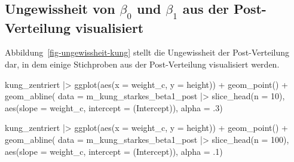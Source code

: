 \documentclass[
  ngerman,
  letterpaper,
  twoside,
  open=any]{scrbook}
\newenvironment{Shaded}{\begin{snugshade}}{\end{snugshade}}
\newcommand{\AttributeTok}[1]{\textcolor[rgb]{0.40,0.45,0.13}{#1}}
\newcommand{\DecValTok}[1]{\textcolor[rgb]{0.68,0.00,0.00}{#1}}
\newcommand{\FunctionTok}[1]{\textcolor[rgb]{0.28,0.35,0.67}{#1}}
\newcommand{\NormalTok}[1]{\textcolor[rgb]{0.00,0.23,0.31}{#1}}
\newcommand{\SpecialCharTok}[1]{\textcolor[rgb]{0.37,0.37,0.37}{#1}}
\newcommand{\StringTok}[1]{\textcolor[rgb]{0.13,0.47,0.30}{#1}}
\theoremstyle{definition}
\theoremstyle{plain}
\theoremstyle{definition}
\theoremstyle{definition}
\theoremstyle{definition}
\theoremstyle{definition}
\theoremstyle{remark}
\begin{document}
\subsection{\texorpdfstring{Ungewissheit von \(\beta_0\) und \(\beta_1\)
aus der Post-Verteilung
visualisiert}{Ungewissheit von \textbackslash beta\_0 und \textbackslash beta\_1 aus der Post-Verteilung visualisiert}}\label{ungewissheit-von-beta_0-und-beta_1-aus-der-post-verteilung-visualisiert}

Abbildung~\ref{fig-ungewissheit-kung} stellt die Ungewissheit der
Post-Verteilung dar, in dem einige Stichproben aus der Post-Verteilung
visualisiert werden.

\begin{Shaded}
\begin{Highlighting}[]
\NormalTok{kung\_zentriert }\SpecialCharTok{|\textgreater{}}
  \FunctionTok{ggplot}\NormalTok{(}\FunctionTok{aes}\NormalTok{(}\AttributeTok{x =}\NormalTok{ weight\_c, }\AttributeTok{y =}\NormalTok{ height)) }\SpecialCharTok{+}
  \FunctionTok{geom\_point}\NormalTok{() }\SpecialCharTok{+}
  \FunctionTok{geom\_abline}\NormalTok{(}
    \AttributeTok{data =}\NormalTok{ m\_kung\_starkes\_beta1\_post }\SpecialCharTok{|\textgreater{}} \FunctionTok{slice\_head}\NormalTok{(}\AttributeTok{n =} \DecValTok{10}\NormalTok{),}
    \FunctionTok{aes}\NormalTok{(}\AttributeTok{slope =}\NormalTok{ weight\_c, }\AttributeTok{intercept =} \StringTok{\textasciigrave{}}\AttributeTok{(Intercept)}\StringTok{\textasciigrave{}}\NormalTok{),}
    \AttributeTok{alpha =}\NormalTok{ .}\DecValTok{3}\NormalTok{)}

\NormalTok{kung\_zentriert }\SpecialCharTok{|\textgreater{}}
  \FunctionTok{ggplot}\NormalTok{(}\FunctionTok{aes}\NormalTok{(}\AttributeTok{x =}\NormalTok{ weight\_c, }\AttributeTok{y =}\NormalTok{ height)) }\SpecialCharTok{+}
  \FunctionTok{geom\_point}\NormalTok{() }\SpecialCharTok{+}
  \FunctionTok{geom\_abline}\NormalTok{(}
    \AttributeTok{data =}\NormalTok{ m\_kung\_starkes\_beta1\_post }\SpecialCharTok{|\textgreater{}} \FunctionTok{slice\_head}\NormalTok{(}\AttributeTok{n =} \DecValTok{100}\NormalTok{),}
    \FunctionTok{aes}\NormalTok{(}\AttributeTok{slope =}\NormalTok{ weight\_c, }\AttributeTok{intercept =} \StringTok{\textasciigrave{}}\AttributeTok{(Intercept)}\StringTok{\textasciigrave{}}\NormalTok{),}
    \AttributeTok{alpha =}\NormalTok{ .}\DecValTok{1}\NormalTok{)}


\end{Highlighting}
\end{Shaded}
\end{document}
